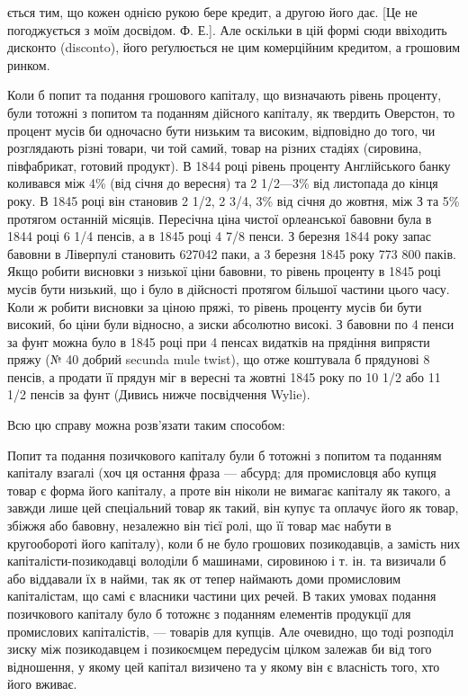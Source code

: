 ється тим, що кожен однією рукою бере кредит, а другою його дає. [Це не погоджується
з моїм досвідом. Ф. Е.]. Але оскільки в цій формі сюди ввіходить
дисконто (disconto), його реґулюється не цим комерційним кредитом, а грошовим
ринком.

Коли б попит та подання грошового капіталу, що визначають рівень
проценту, були тотожні з попитом та поданням дійсного капіталу, як твердить
Оверстон, то процент мусів би одночасно бути низьким та високим, відповідно до
того, чи розглядають різні товари, чи той самий, товар на різних стадіях (сировина,
півфабрикат, готовий продукт). В 1844 році рівень проценту Англійського банку
коливався між 4\% (від січня до вересня) та 2 1/2—3\% від листопада до
кінця року. В 1845 році він становив 2 1/2, 2 3/4, 3\% від січня до жовтня, між
З та 5\% протягом останній місяців. Пересічна ціна чистої орлеанської бавовни
була в 1844 році 6 1/4 пенсів, а в 1845 році 4 7/8 пенси. З березня 1844 року
запас бавовни в Ліверпулі становить 627042 паки, а 3 березня 1845 року
773 800 паків. Якщо робити висновки з низької ціни бавовни, то рівень проценту
в 1845 році мусів бути низький, що і було в дійсності протягом більшої
частини цього часу. Коли ж робити висновки за ціною пряжі, то рівень проценту
мусів би бути високий, бо ціни були відносно, а зиски абсолютно високі.
З бавовни по 4 пенси за фунт можна було в 1845 році при 4 пенсах видатків
на прядіння випрясти пряжу (№ 40 добрий secunda mule twist), що отже коштувала
б прядунові 8 пенсів, а продати її прядун міг в вересні та жовтні 1845 року
по 10 1/2 або 11 1/2 пенсів за фунт (Дивись нижче посвідчення Wylie).

Всю цю справу можна розв’язати таким способом:

Попит та подання позичкового капіталу були б тотожні з попитом та поданням
капіталу взагалі (хоч ця остання фраза — абсурд; для промисловця або
купця товар є форма його капіталу, а проте він ніколи не вимагає капіталу як
такого, а завжди лише цей спеціальний товар як такий, він купує та оплачує
його як товар, збіжжя або бавовну, незалежно він тієї ролі, що її товар має
набути в кругообороті його капіталу), коли б не було грошових позикодавців,
а замість них капіталісти-позикодавці володіли б машинами, сировиною і т. ін. та
визичали б або віддавали їх в найми, так як от тепер наймають доми промисловим
капіталістам, що самі є власники частини цих речей. В таких умовах
подання позичкового капіталу було б тотожнє з поданням елементів продукції
для промислових капіталістів, — товарів для купців. Але очевидно, що тоді розподіл
зиску між позикодавцем і позикоємцем передусім цілком залежав би від
того відношення, у якому цей капітал визичено та у якому він є власність
того, хто його вживає.

